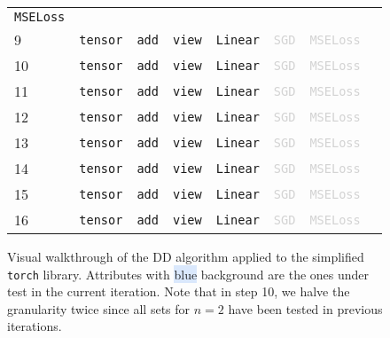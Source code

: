 \documentclass[sigplan,nonacm]{acmart}
\newcommand{\module}[1]{{\texttt{#1}}}
\newcommand{\cmark}{\color{green}\ding{51}}
\newcommand{\xmark}{\color{red}\ding{55}}
\begin{document}
\begin{figure}[t]
{\begin{tabular}{llllllll}
  \cellcolor[HTML]{DAE8FC}\texttt{MSELoss} &
  \xmark \\
9 &
\cellcolor[HTML]{DAE8FC}\texttt{tensor} &
  \cellcolor[HTML]{DAE8FC}\texttt{add} &
  \cellcolor[HTML]{DAE8FC}\texttt{view} &
  \cellcolor[HTML]{DAE8FC}\texttt{Linear} &
  \textcolor{lightgray}{\texttt{SGD}} &
  \textcolor{lightgray}{\texttt{MSELoss}} &
  \cmark \\
10 &
\cellcolor[HTML]{DAE8FC}\texttt{tensor} &
  \texttt{add} &
  \texttt{view} &
  \texttt{Linear} &
  \textcolor{lightgray}{\texttt{SGD}} &
  \textcolor{lightgray}{\texttt{MSELoss}} &
  \xmark \\
11 &
\texttt{tensor} &
  \cellcolor[HTML]{DAE8FC}\texttt{add} &
  \texttt{view} &
  \texttt{Linear} &
  \textcolor{lightgray}{\texttt{SGD}} &
  \textcolor{lightgray}{\texttt{MSELoss}} &
  \xmark \\
12 &
\texttt{tensor} &
  \texttt{add} &
  \cellcolor[HTML]{DAE8FC}\texttt{view} &
  \texttt{Linear} &
  \textcolor{lightgray}{\texttt{SGD}} &
  \textcolor{lightgray}{\texttt{MSELoss}} &
  \xmark \\
13 &
\texttt{tensor} &
  \texttt{add} &
  \texttt{view} &
  \cellcolor[HTML]{DAE8FC}\texttt{Linear} &
  \textcolor{lightgray}{\texttt{SGD}} &
  \textcolor{lightgray}{\texttt{MSELoss}} &
  \xmark \\
14 &
\texttt{tensor} &
  \cellcolor[HTML]{DAE8FC}\texttt{add} &
  \cellcolor[HTML]{DAE8FC}\texttt{view} &
  \cellcolor[HTML]{DAE8FC}\texttt{Linear} &
  \textcolor{lightgray}{\texttt{SGD}} &
  \textcolor{lightgray}{\texttt{MSELoss}} &
  \xmark \\
15 &
\cellcolor[HTML]{DAE8FC}\texttt{tensor} &
  \texttt{add} &
  \cellcolor[HTML]{DAE8FC}\texttt{view} &
  \cellcolor[HTML]{DAE8FC}\texttt{Linear} &
  \textcolor{lightgray}{\texttt{SGD}} &
  \textcolor{lightgray}{\texttt{MSELoss}} &
  \xmark \\
16 &
\cellcolor[HTML]{DAE8FC}\texttt{tensor} &
  \cellcolor[HTML]{DAE8FC}\texttt{add} &
  \texttt{view} &
  \cellcolor[HTML]{DAE8FC}\texttt{Linear} &
  \textcolor{lightgray}{\texttt{SGD}} &
  \textcolor{lightgray}{\texttt{MSELoss}} &
  \xmark
\end{tabular}} \caption{Visual walkthrough of the DD algorithm applied to the simplified \module{torch} library.
    Attributes with \colorbox[HTML]{DAE8FC}{blue} background are the ones under test in the current iteration.
    Note that in step 10, we halve the granularity twice since all sets for $n=2$ have been tested in previous iterations.}
\label{fig:dd-visual}
\end{figure}
\end{document}
